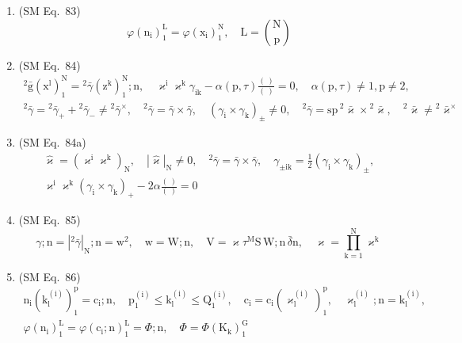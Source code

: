 \documentclass[12pt]{article}
\begin{document}
\begin{enumerate}[label=(\arabic*), series=formellist]
    \item (SM Eq.\ 83) 
    \[
    \varphi(\mathrm{n_i})_1^\mathrm{L} = \varphi(\mathrm{x_i})_1^\mathrm{N}, \quad \mathrm{L} = \binom{\mathrm{N}}{\mathrm{p}}
    \]

    \item (SM Eq.\ 84) 
    \[
    \begin{gathered}
    {}^2\bar{\mathrm{g}}\left( \mathrm{x^l} \right)_1^\mathrm{N} = {}^2\bar{\gamma}\left( \mathrm{z^k} \right)_1^\mathrm{N};\mathrm{n}, \quad \varkappa^\mathrm{i} \varkappa^\mathrm{k} \gamma_{\mathrm{ik}} - \alpha(\mathrm{p}, \tau)\frac{(\ )}{(\ )} = 0, \quad \alpha(\mathrm{p}, \tau) \ne 1, \mathrm{p} \ne 2, \\
    {}^2\bar{\gamma} = {}^2\bar{\gamma}_+ + {}^2\bar{\gamma}_- \ne {}^2\bar{\gamma}^\times, \quad {}^2\bar{\gamma} = \bar{\gamma} \times \bar{\gamma}, \quad (\gamma_\mathrm{i} \times \gamma_\mathrm{k})_\pm \ne 0, \quad {}^2\bar{\gamma} = \mathrm{sp}\,{}^2\bar{\varkappa} \times {}^2\bar{\varkappa}, \quad {}^2\bar{\varkappa} \ne {}^2\bar{\varkappa}^\times
    \end{gathered}
    \]

    \item (SM Eq.\ 84a) 
    \[
    \begin{gathered}
    \hat{\varkappa} = \left( \varkappa^\mathrm{i} \varkappa^\mathrm{k} \right)_\mathrm{N}, \quad \left|\hat{\varkappa}\right|_\mathrm{N} \ne 0, \quad {}^2\bar{\gamma} = \bar{\gamma} \times \bar{\gamma}, \quad \gamma_{\pm \mathrm{ik}} = \frac{1}{2} \left(\gamma_\mathrm{i} \times \gamma_\mathrm{k}\right)_\pm, \\
    \varkappa^\mathrm{i} \varkappa^\mathrm{k} \left(\gamma_\mathrm{i} \times \gamma_\mathrm{k}\right)_+ - 2\alpha \frac{(\ )}{(\ )} = 0
    \end{gathered}
    \]

    \item (SM Eq.\ 85) 
    \[
    \gamma;\mathrm{n} = \left|{}^2\bar{\gamma}\right|_\mathrm{N};\mathrm{n} = \mathrm{w}^2, \quad \mathrm{w} = \mathrm{W};\mathrm{n}, \quad \mathrm{V} = \varkappa \tau^\mathrm{M} \mathrm{S}\,\mathrm{W};\mathrm{n}\,\bar{\delta}\mathrm{n}, \quad \varkappa = \prod_{\mathrm{k}=1}^\mathrm{N} \varkappa^\mathrm{k}
    \]

    \item (SM Eq.\ 86) 
    \[
    \begin{gathered}
    \mathrm{n_i} \left( \mathrm{k_l^{(i)}} \right)_1^\mathrm{p} = \mathrm{c_i};\mathrm{n}, \quad \mathrm{p_1^{(i)}} \le \mathrm{k_l^{(i)}} \le \mathrm{Q_1^{(i)}}, \quad \mathrm{c_i} = \mathrm{c_i} \left( \varkappa_\mathrm{l}^{\mathrm{(i)}} \right)_1^\mathrm{p}, \quad \varkappa_\mathrm{l}^{\mathrm{(i)}};\mathrm{n} = \mathrm{k_l^{(i)}}, \\
    \varphi(\mathrm{n_i})_1^\mathrm{L} = \varphi(\mathrm{c_i};\mathrm{n})_1^\mathrm{L} = \Phi;\mathrm{n}, \quad \Phi = \Phi(\mathrm{K_k})_1^\mathrm{G}
    \end{gathered}
    \]


\end{enumerate}
\end{document}
